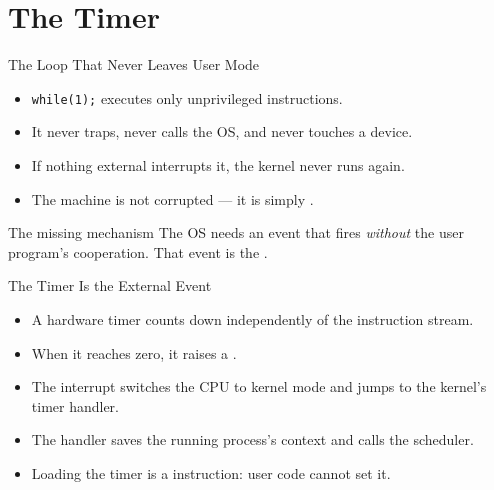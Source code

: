 \documentclass[aspectratio=169]{beamer}
\begin{document}
\section{The Timer}


\begin{frame}{The Loop That Never Leaves User Mode}
  \begin{itemize}
    \item \texttt{while(1);} executes only unprivileged instructions.
    \item It never traps, never calls the OS, and never touches a device.
    \item If nothing external interrupts it, the kernel never runs again.
    \item The machine is not corrupted --- it is simply .
  \end{itemize}
  \vspace{0.2cm}
  \begin{block}{The missing mechanism}
    The OS needs an event that fires \emph{without} the user program's
    cooperation. That event is the .
  \end{block}
\end{frame}

\begin{frame}{The Timer Is the External Event}
  \begin{itemize}
    \item A hardware timer counts down independently of the instruction stream.
    \item When it reaches zero, it raises a .
    \item The interrupt switches the CPU to kernel mode and jumps to the
      kernel's timer handler.
    \item The handler saves the running process's context and calls the
      scheduler.
    \item Loading the timer is a  instruction: user code cannot
      set it.
  \end{itemize}
  \vspace{0.2cm}
\end{frame}
\end{document}
